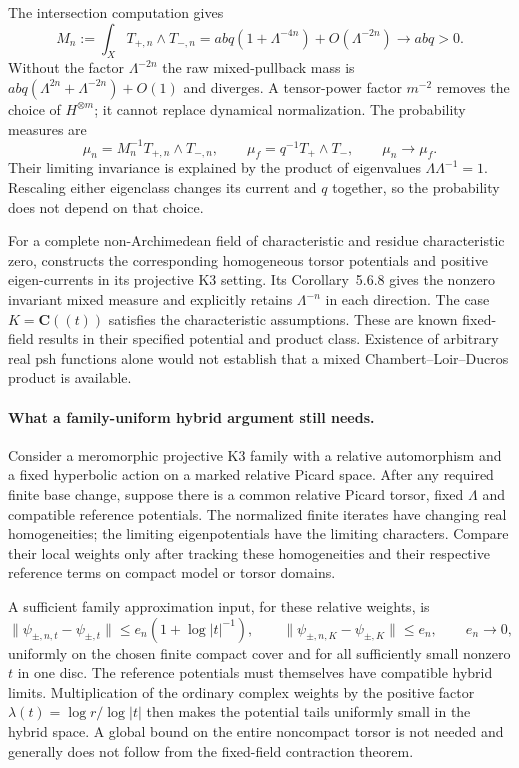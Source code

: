 The intersection computation gives
\[
 M_n:=\int_X T_{+,n}\wedge T_{-,n}
       =abq(1+\Lambda^{-4n})+O(\Lambda^{-2n})
       \longrightarrow abq>0.
\tag{66.29x}\label{eq:hybrid-K3-approximant-mass}
\]
Without the factor $\Lambda^{-2n}$ the raw mixed-pullback mass is
$abq(\Lambda^{2n}+\Lambda^{-2n})+O(1)$ and diverges. A tensor-power
factor $m^{-2}$ removes the choice of $H^{\otimes m}$; it cannot
replace dynamical normalization. The probability measures are
\[
 \mu_n=M_n^{-1}T_{+,n}\wedge T_{-,n},\qquad
 \mu_f=q^{-1}T_+\wedge T_-,\qquad
 \mu_n\longrightarrow\mu_f.
\tag{66.29y}\label{eq:hybrid-K3-invariant-probability}
\]
Their limiting invariance is explained by the product of eigenvalues
$\Lambda\Lambda^{-1}=1$. Rescaling either eigenclass changes its
current and $q$ together, so the probability does not depend on
that choice.

For a complete non-Archimedean field of characteristic and residue
characteristic zero, \cite[Theorems~5.6.4, 5.6.5 and~5.6.7]{Filip19K3V1}
constructs the corresponding homogeneous torsor potentials and positive
eigen-currents in its projective K3 setting.
Its Corollary~5.6.8 gives the nonzero invariant mixed measure and
explicitly retains $\Lambda^{-n}$ in each direction.
The case $K=\mathbf C((t))$ satisfies the characteristic assumptions.
These are known fixed-field results in their specified potential and
product class. Existence of arbitrary real psh functions alone would
not establish that a mixed Chambert--Loir--Ducros product is available.

\paragraph{What a family-uniform hybrid argument still needs.}
Consider a meromorphic projective K3 family with a relative
automorphism and a fixed hyperbolic action on a marked relative Picard
space. After any required finite base change, suppose there is a
common relative Picard torsor, fixed $\Lambda$ and compatible reference
potentials. The normalized finite iterates have changing real
homogeneities; the limiting eigenpotentials have the limiting characters.
Compare their local weights only after tracking these homogeneities
and their respective reference terms on compact model or torsor domains.

A sufficient family approximation input, for these relative weights,
is
\[
 \|\psi_{\pm,n,t}-\psi_{\pm,t}\|
         \leq e_n(1+\log|t|^{-1}),\qquad
 \|\psi_{\pm,n,K}-\psi_{\pm,K}\|\leq e_n,
 \qquad e_n\longrightarrow0,
\tag{66.29z}\label{eq:hybrid-K3-uniformity-input}
\]
uniformly on the chosen finite compact cover and for all sufficiently
small nonzero $t$ in one disc. The reference potentials must themselves
have compatible hybrid limits. Multiplication of the ordinary complex
weights by the positive factor $\lambda(t)=\log r/\log|t|$ then makes
the potential tails uniformly small in the hybrid space. A global
bound on the entire noncompact torsor is not needed and generally
does not follow from the fixed-field contraction theorem.

